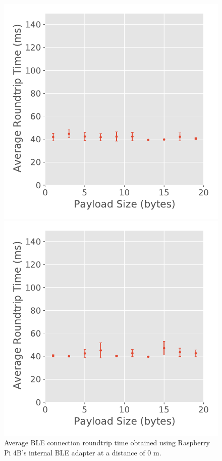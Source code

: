 \begin{figure}[H]
    \centering
    \begin{minipage}{0.45\linewidth}
        \centering
        \includegraphics[width=\linewidth]{images/ble-roundtrip-hci1-0cm.pdf}
        \caption[Average \acs{BLE} connection roundtrip time obtained using the Raspberry Pi 4B's internal \acs{BLE} adapter at a distance of 0 m.]{Average \acs{BLE} connection roundtrip time obtained using Raspberry Pi 4B's internal \acs{BLE} adapter at a distance of $0\text{ m}$.}
        \label{fig:ble-roundtrip-hci1-0m}
    \end{minipage}
    \hspace{0.05\linewidth}
    \begin{minipage}{0.45\linewidth}
        \centering
        \includegraphics[width=\linewidth]{images/ble-roundtrip-hci1-300cm.pdf}

\end{minipage}
\end{figure}
